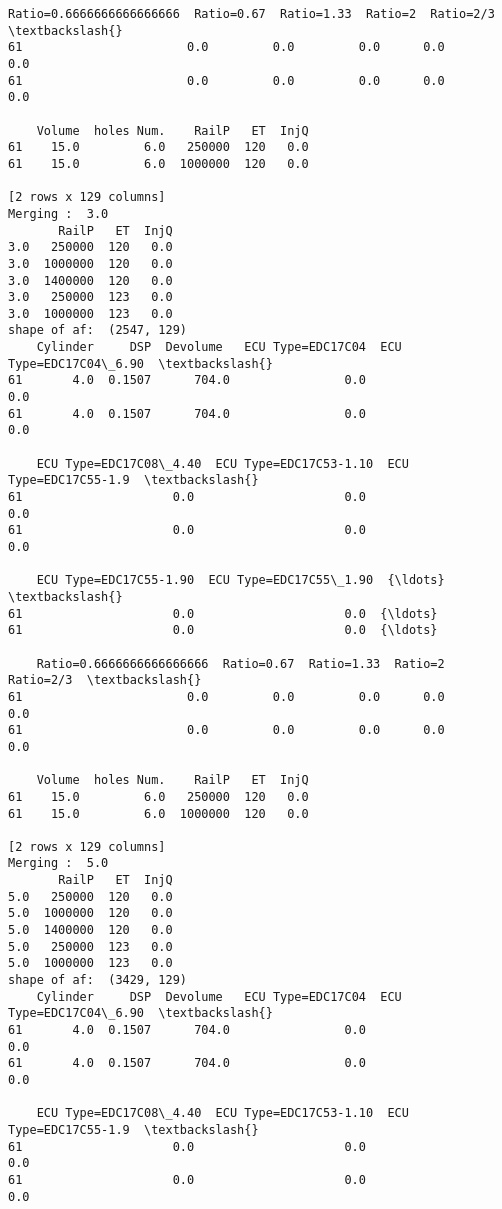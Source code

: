 \documentclass[11pt]{article}
\begin{document}
\begin{Verbatim}[commandchars=\\\{\}]
    Ratio=0.6666666666666666  Ratio=0.67  Ratio=1.33  Ratio=2  Ratio=2/3  \textbackslash{}
61                       0.0         0.0         0.0      0.0        0.0   
61                       0.0         0.0         0.0      0.0        0.0   

    Volume  holes Num.    RailP   ET  InjQ  
61    15.0         6.0   250000  120   0.0  
61    15.0         6.0  1000000  120   0.0  

[2 rows x 129 columns]
Merging :  3.0
       RailP   ET  InjQ
3.0   250000  120   0.0
3.0  1000000  120   0.0
3.0  1400000  120   0.0
3.0   250000  123   0.0
3.0  1000000  123   0.0
shape of af:  (2547, 129)
    Cylinder     DSP  Devolume   ECU Type=EDC17C04  ECU Type=EDC17C04\_6.90  \textbackslash{}
61       4.0  0.1507      704.0                0.0                     0.0   
61       4.0  0.1507      704.0                0.0                     0.0   

    ECU Type=EDC17C08\_4.40  ECU Type=EDC17C53-1.10  ECU Type=EDC17C55-1.9  \textbackslash{}
61                     0.0                     0.0                    0.0   
61                     0.0                     0.0                    0.0   

    ECU Type=EDC17C55-1.90  ECU Type=EDC17C55\_1.90  {\ldots}   \textbackslash{}
61                     0.0                     0.0  {\ldots}    
61                     0.0                     0.0  {\ldots}    

    Ratio=0.6666666666666666  Ratio=0.67  Ratio=1.33  Ratio=2  Ratio=2/3  \textbackslash{}
61                       0.0         0.0         0.0      0.0        0.0   
61                       0.0         0.0         0.0      0.0        0.0   

    Volume  holes Num.    RailP   ET  InjQ  
61    15.0         6.0   250000  120   0.0  
61    15.0         6.0  1000000  120   0.0  

[2 rows x 129 columns]
Merging :  5.0
       RailP   ET  InjQ
5.0   250000  120   0.0
5.0  1000000  120   0.0
5.0  1400000  120   0.0
5.0   250000  123   0.0
5.0  1000000  123   0.0
shape of af:  (3429, 129)
    Cylinder     DSP  Devolume   ECU Type=EDC17C04  ECU Type=EDC17C04\_6.90  \textbackslash{}
61       4.0  0.1507      704.0                0.0                     0.0   
61       4.0  0.1507      704.0                0.0                     0.0   

    ECU Type=EDC17C08\_4.40  ECU Type=EDC17C53-1.10  ECU Type=EDC17C55-1.9  \textbackslash{}
61                     0.0                     0.0                    0.0   
61                     0.0                     0.0                    0.0   


\end{Verbatim}
\end{document}
